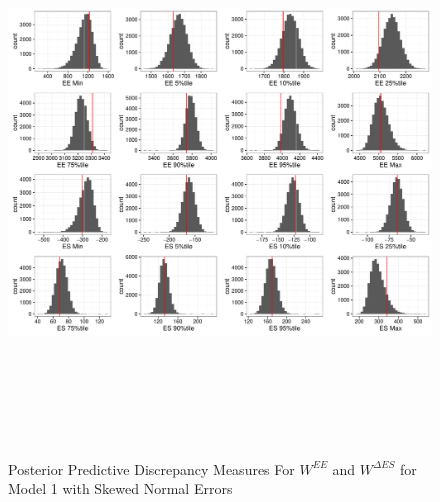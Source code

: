 \documentclass[11pt]{article}\usepackage[]{graphicx}\usepackage[]{color}
\begin{document}
  \begin{figure}
  \centering
  \includegraphics[width=17cm,height=15cm]{manual_figure/wpwdiag1s.pdf}
  \caption{Posterior Predictive Discrepancy Measures For $W^{EE}$ and $W^{\Delta ES}$ for Model 1 with Skewed Normal Errors}
  \label{wpwdiag1s}
  \end{figure}
\end{document}
